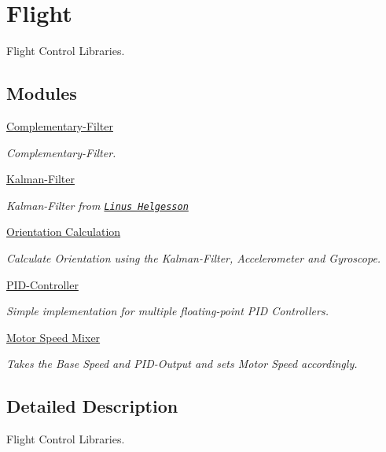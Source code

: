 \hypertarget{group___flight}{\section{Flight}
\label{group___flight}
}


Flight Control Libraries.  


\subsection*{Modules}
\begin{DoxyCompactItemize}
\item 
\hyperlink{group__complementary}{Complementary-\/\-Filter}
\begin{DoxyCompactList}\small\item\em Complementary-\/\-Filter. \end{DoxyCompactList}\item 
\hyperlink{group__kalman}{Kalman-\/\-Filter}
\begin{DoxyCompactList}\small\item\em Kalman-\/\-Filter from \href{http://www.linushelgesson.se/2012/04/pitch-and-roll-estimating-kalman-filter-for-stabilizing-quadrocopters/}{\tt Linus Helgesson} \end{DoxyCompactList}\item 
\hyperlink{group__orientation}{Orientation Calculation}
\begin{DoxyCompactList}\small\item\em Calculate Orientation using the Kalman-\/\-Filter, Accelerometer and Gyroscope. \end{DoxyCompactList}\item 
\hyperlink{group__pid}{P\-I\-D-\/\-Controller}
\begin{DoxyCompactList}\small\item\em Simple implementation for multiple floating-\/point P\-I\-D Controllers. \end{DoxyCompactList}\item 
\hyperlink{group__set}{Motor Speed Mixer}
\begin{DoxyCompactList}\small\item\em Takes the Base Speed and P\-I\-D-\/\-Output and sets Motor Speed accordingly. \end{DoxyCompactList}\end{DoxyCompactItemize}


\subsection{Detailed Description}
Flight Control Libraries. 